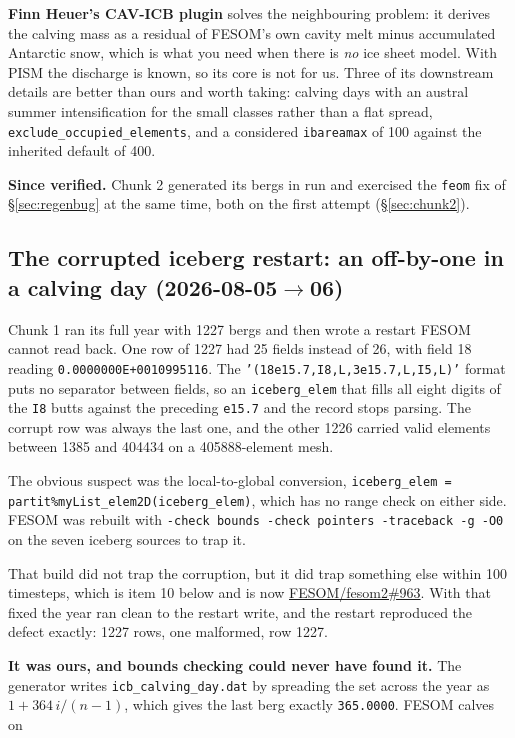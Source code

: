 \documentclass[11pt,a4paper]{article}
\newcommand{\code}[1]{\texttt{\small #1}}
\begin{document}
\medskip\noindent
\textbf{Finn Heuer's CAV-ICB plugin} solves the neighbouring problem: it derives the calving mass as
a residual of FESOM's own cavity melt minus accumulated Antarctic snow, which is what you need when
there is \emph{no} ice sheet model. With PISM the discharge is known, so its core is not for us.
Three of its downstream details are better than ours and worth taking: calving days with an austral
summer intensification for the small classes rather than a flat spread,
\code{exclude\_occupied\_elements}, and a considered \code{ibareamax} of 100 against the inherited
default of 400.

\medskip\noindent
\textbf{Since verified.} Chunk 2 generated its bergs in run and exercised the \code{feom} fix of
\S\ref{sec:regenbug} at the same time, both on the first attempt (\S\ref{sec:chunk2}).

\subsection{The corrupted iceberg restart: an off-by-one in a calving day (2026-08-05$\to$06)}
\label{sec:icbrestart}

Chunk 1 ran its full year with 1227 bergs and then wrote a restart FESOM cannot read back. One
row of 1227 had 25 fields instead of 26, with field 18 reading \code{0.0000000E+0010995116}.
The \code{'(18e15.7,I8,L,3e15.7,L,I5,L)'} format puts no separator between fields, so an
\code{iceberg\_elem} that fills all eight digits of the \code{I8} butts against the preceding
\code{e15.7} and the record stops parsing. The corrupt row was always the last one, and the other
1226 carried valid elements between 1385 and 404434 on a 405888-element mesh.

The obvious suspect was the local-to-global conversion, \code{iceberg\_elem =
partit\%myList\_elem2D(iceberg\_elem)}, which has no range check on either side. FESOM was rebuilt
with \code{-check bounds -check pointers -traceback -g -O0} on the seven iceberg sources to trap
it.

That build did not trap the corruption, but it did trap something else within 100 timesteps,
which is item 10 below and is now
\href{https://github.com/FESOM/fesom2/pull/963}{FESOM/fesom2\#963}. With that fixed the year ran
clean to the restart write, and the restart reproduced the defect exactly: 1227 rows, one
malformed, row 1227.

\medskip\noindent
\textbf{It was ours, and bounds checking could never have found it.} The generator writes
\code{icb\_calving\_day.dat} by spreading the set across the year as
$1 + 364\,i/(n-1)$, which gives the last berg exactly \code{365.0000}. FESOM calves on
\end{document}
